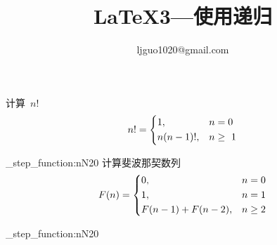 \documentclass{ctexart}
\begin{document}
\title{\LaTeX3---使用递归}
\author{ljguo1020@gmail.com}
\maketitle
\ExplSyntaxOn
计算~$n!$~
\[
  n!= 
    \begin{dcases}
        1,&n=0\\
        n(n-1)!,&n\geq ~ 1
    \end{dcases}
\]\par
\int_step_function:nN{20}\fact
\newpage
计算斐波那契数列
\[
F(n)=
\begin{dcases}
    0,&n=0\\
    1,&n=1\\
    F(n-1)+F(n-2),&n\geq 2
\end{dcases}
\]\par
\int_step_function:nN{20}\fibon
\ExplSyntaxOff
\end{document}
